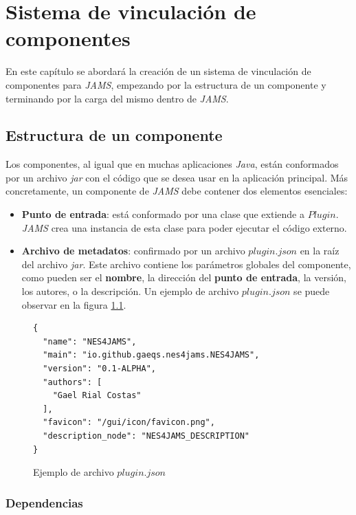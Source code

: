 \chapter{Sistema de vinculación de componentes}\label{ch:sistema-de-vinculacion-de-componentes}

En este capítulo se abordará la creación de un sistema de
vinculación de componentes para \textit{JAMS}, empezando por
la estructura de un componente y terminando por la carga
del mismo dentro de \textit{JAMS}.

\section{Estructura de un componente}\label{sec:estructura-de-un-componente}

Los componentes, al igual que en muchas aplicaciones \textit{Java},
están conformados por un archivo \textit{jar} con el código que
se desea usar en la aplicación principal.
Más concretamente, un componente de \textit{JAMS} debe contener
dos elementos esenciales:
\begin{itemize}
    \item \textbf{Punto de entrada}: está conformado por una
    clase que extiende a $Plugin$.
    \textit{JAMS} crea una instancia de esta clase para
    poder ejecutar el código externo.
    \item \textbf{Archivo de metadatos}: confirmado por un archivo
    $plugin.json$ en la raíz del archivo \textit{jar}.
    Este archivo contiene los parámetros globales del componente,
    como pueden ser el \textbf{nombre}, la dirección del
    \textbf{punto de entrada}, la versión, los autores,
    o la descripción.
    Un ejemplo de archivo $plugin.json$ se puede observar en la
    figura \ref{fig:plugin-json}.
\end{itemize}


\begin{figure}[h]
    \centering
    \begin{lstlisting}[frame=single,label={lst:plugin-json}]
{
  "name": "NES4JAMS",
  "main": "io.github.gaeqs.nes4jams.NES4JAMS",
  "version": "0.1-ALPHA",
  "authors": [
    "Gael Rial Costas"
  ],
  "favicon": "/gui/icon/favicon.png",
  "description_node": "NES4JAMS_DESCRIPTION"
}
    \end{lstlisting}
    \caption{Ejemplo de archivo $plugin.json$}
    \label{fig:plugin-json}
\end{figure}

\subsection{Dependencias}\label{subsec:dependencias}

